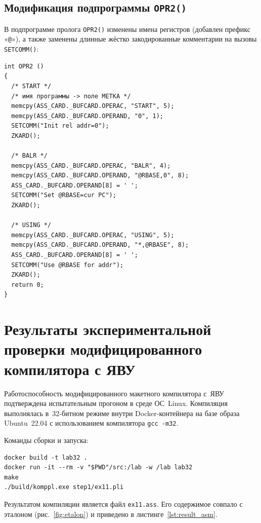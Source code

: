 \documentclass[a4paper,14pt]{extarticle}
\begin{document}
\subsection{Модификация подпрограммы \texttt{OPR2()}}

В подпрограмме пролога \texttt{OPR2()} изменены имена регистров
(добавлен префикс «\texttt{@}»), а также заменены длинные жёстко закодированные
комментарии на вызовы \texttt{SETCOMM()}:

\begin{lstlisting}[style=Cstyle,caption={Модификация подпрограммы \texttt{OPR2()}},label=lst:opr2]
int OPR2 ()
{
  /* START */
  /* имя программы -> поле METKA */
  memcpy(ASS_CARD._BUFCARD.OPERAC, "START", 5);
  memcpy(ASS_CARD._BUFCARD.OPERAND, "0", 1);
  SETCOMM("Init rel addr=0");
  ZKARD();

  /* BALR */
  memcpy(ASS_CARD._BUFCARD.OPERAC, "BALR", 4);
  memcpy(ASS_CARD._BUFCARD.OPERAND, "@RBASE,0", 8);
  ASS_CARD._BUFCARD.OPERAND[8] = ' ';
  SETCOMM("Set @RBASE=cur PC");
  ZKARD();

  /* USING */
  memcpy(ASS_CARD._BUFCARD.OPERAC, "USING", 5);
  memcpy(ASS_CARD._BUFCARD.OPERAND, "*,@RBASE", 8);
  ASS_CARD._BUFCARD.OPERAND[8] = ' ';
  SETCOMM("Use @RBASE for addr");
  ZKARD();
  return 0;
}
\end{lstlisting}

\section{Результаты экспериментальной проверки модифицированного компилятора с ЯВУ}

Работоспособность модифицированного макетного компилятора с~ЯВУ подтверждена
испытательным прогоном в среде ОС~Linux. Компиляция выполнялась в~32-битном
режиме внутри Docker-контейнера на базе образа Ubuntu~22.04 с использованием
компилятора \texttt{gcc~-m32}.

Команды сборки и запуска:

\begin{lstlisting}[style=ASMstyle,caption={Команды сборки и запуска компилятора},label=lst:build]
docker build -t lab32 .
docker run -it --rm -v "$PWD"/src:/lab -w /lab lab32
make
./build/komppl.exe step1/ex11.pli
\end{lstlisting}

Результатом компиляции является файл \texttt{ex11.ass}. Его содержимое совпало с
эталоном (рис.~\ref{fig:etalon}) и приведено в листинге~\ref{lst:result_asm}.
\end{document}
